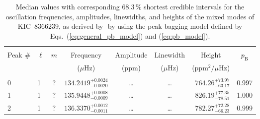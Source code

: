 \begin{table*}[!]
\caption{Median values with corresponding 68.3\,\% shortest credible intervals for the oscillation frequencies, amplitudes, linewidths, and heights of the mixed modes of KIC~8366239, as derived by \diamonds\,\,by using the peak bagging model defined by Eqs.~(\ref{eq:general_pb_model}) and (\ref{eq:pb_model}).}
\label{tab:8366239m}
\centering
\begin{tabular}{llcrrlrc}
\hline\hline
\\[-8pt]      
Peak \# & $\ell$ & $m$ & \multicolumn{1}{c}{Frequency} & \multicolumn{1}{c}{Amplitude} & \multicolumn{1}{c}{Linewidth} & \multicolumn{1}{c}{Height}& $p_\mathrm{B}$\\
 & & & \multicolumn{1}{c}{($\mu$Hz)} & \multicolumn{1}{c}{(ppm)} & \multicolumn{1}{c}{($\mu$Hz)} & \multicolumn{1}{c}{(ppm$^2/\mu$Hz)}\\
\hline \\[-8pt]

0 & 1 & ? & $    134.2419_{-      0.0020}^{+      0.0024}$ & \multicolumn{1}{c}{\dots} & \multicolumn{1}{c}{\dots} & $      764.26_{-       63.17}^{+       73.97}$ & 0.997\\[1pt]
1 & 1 & ? & $    135.9448_{-      0.0009}^{+      0.0008}$ & \multicolumn{1}{c}{\dots} & \multicolumn{1}{c}{\dots} & $      826.19_{-       78.51}^{+       77.35}$ & 1.000\\[1pt]
2 & 1 & ? & $    136.3370_{-      0.0011}^{+      0.0012}$ & \multicolumn{1}{c}{\dots} & \multicolumn{1}{c}{\dots} & $      782.27_{-       66.23}^{+       72.28}$ & 0.999\\[1pt]


\end{tabular}
\end{table*}
